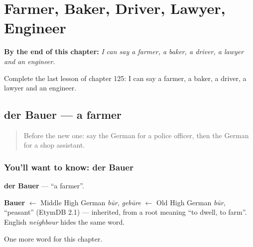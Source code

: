 
\chapter{Farmer, Baker, Driver, Lawyer, Engineer}
\label{ch:ge-farmer-baker-driver-lawyer-engineer}

\begin{chapteropening}
\textbf{By the end of this chapter:} \emph{I can say a farmer, a baker, a driver, a lawyer and an engineer.}

Complete the last lesson of chapter 125: I can say a farmer, a baker, a driver, a lawyer and an engineer.
\end{chapteropening}

\section[der Bauer]{der Bauer — a farmer}

\label{lesson:GE-C125-bauer}



\begin{quote}
Before the new one: say the German for a police officer, then the German for a shop assistant.
\end{quote}

\subsection*{You'll want to know: der Bauer}
\textbf{der Bauer} — \textquotedblleft{}a farmer\textquotedblright{}.

\begin{cousinweb}
\textbf{Bauer} $\leftarrow$ Middle High German \emph{būr}, \emph{gebūre} $\leftarrow$ Old High German \emph{būr}, \textquotedblleft{}peasant\textquotedblright{} (EtymDB 2.1) — inherited, from a root meaning \textquotedblleft{}to dwell, to farm\textquotedblright{}. English \emph{neighbour} hides the same word.
\end{cousinweb}

\begin{grammarlens}[title={What you've built}]
One more word for this chapter.
\end{grammarlens}

